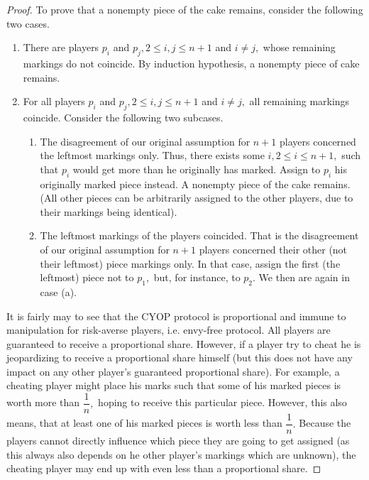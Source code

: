 \documentclass[a4paper, 12pt]{article}
\begin{document}
\begin{proof}
To prove that a nonempty piece of the cake remains, consider the following two cases.
\begin{enumerate}
	\item There are players $p_i$ and $p_j, 2 \leqslant i, j \leqslant n + 1$ and $i \neq j,$ whose remaining markings do not coincide. By induction hypothesis, a nonempty piece of cake remains. 
	\item For all players $p_i$ and $p_j, 2 \leqslant i, j \leqslant n + 1$ and $i \neq j,$ all remaining markings coincide. Consider the following two subcases.
\begin{enumerate}
	\item The disagreement of our original assumption for $n+1$ players concerned the leftmost markings only. Thus, there exists some $i, 2 \leqslant i \leqslant n + 1,$ such that $p_i$ would get more than he originally has marked. Assign to $p_i$  his originally marked piece instead. A nonempty piece of the cake remains. (All other pieces can be arbitrarily assigned to the other players, due to their markings being identical).
	\item The leftmost markings of the players coincided. That is the disagreement of our original assumption for $n+1$ players concerned their other (not their leftmost) piece markings only. In that case, assign the first (the leftmost) piece not to $p_1,$  but, for instance,  to $p_2.$ We then are again in case (a).
\end{enumerate}
\end{enumerate}
It is fairly may to see that the CYOP protocol is proportional and immune to manipulation for risk-averse players, i.e. envy-free protocol. All players are guaranteed to receive a proportional share. However, if a player try to cheat he is jeopardizing to receive a proportional share himself (but this does not have any impact on any other player's guaranteed proportional share). For example, a cheating player might place his marks such that some of his marked pieces is worth more than $\dfrac{1}{n},$ hoping to receive this particular piece. However, this also means, that at least one of his marked pieces is worth less than $\dfrac{1}{n}.$ Because the players cannot directly influence which piece they are going to get assigned (as this always also depends on he other player's markings which are unknown), the cheating player may end up with even less than a proportional share.    
 
\end{proof}
\end{document}
